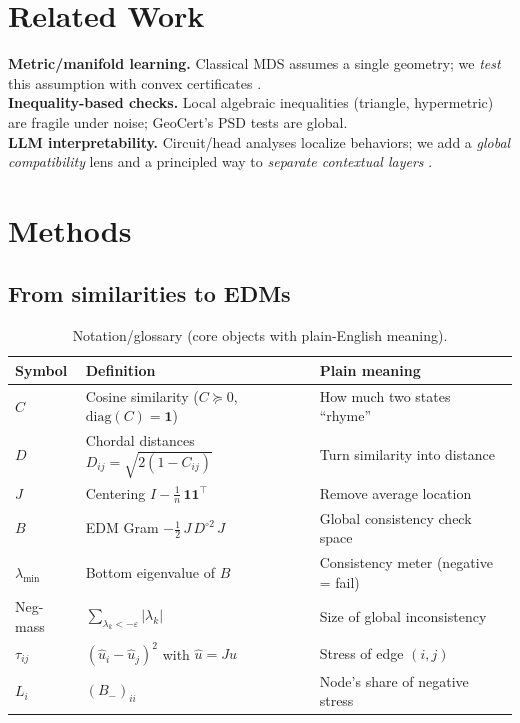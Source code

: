 \documentclass[11pt]{article}
\newcommand{\1}{\mathbf{1}}
\newcommand{\diag}{\mathrm{diag}}
\newcommand{\PSD}{\succeq 0}
\begin{document}
\section{Related Work}
\textbf{Metric/manifold learning.} Classical MDS assumes a single geometry; we \emph{test} this assumption with convex certificates \citep{torgerson1952,borg2005}.\\
\textbf{Inequality-based checks.} Local algebraic inequalities (triangle, hypermetric) are fragile under noise; GeoCert’s PSD tests are global.\\
\textbf{LLM interpretability.} Circuit/head analyses localize behaviors; we add a \emph{global compatibility} lens and a principled way to \emph{separate contextual layers} \citep{Vig2020CausalMediation,Elazar2021Amnesic,Meng2022ROME}.

\section{Methods}
\subsection{From similarities to EDMs}\label{sec:fromCtoB}
\begin{table}[t]
\centering
\caption{Notation/glossary (core objects with plain-English meaning).}
\begin{tabular}{lll}
\toprule
Symbol & Definition & Plain meaning \\
\midrule
$C$ & Cosine similarity ($C\PSD$, $\diag(C)=\mathbf{1}$) & How much two states ``rhyme'' \\
$D$ & Chordal distances $D_{ij}=\sqrt{2(1-C_{ij})}$ & Turn similarity into distance \\
$J$ & Centering $I-\tfrac1n\,\mathbf{1}\mathbf{1}^\top$ & Remove average location \\
$B$ & EDM Gram $-\tfrac12\,J\,D^{\circ2}\,J$ & Global consistency check space \\
$\lambda_{\min}$ & Bottom eigenvalue of $B$ & Consistency meter (negative = fail) \\
Neg-mass & $\sum_{\lambda_k< -\varepsilon}|\lambda_k|$ & Size of global inconsistency \\
$\tau_{ij}$ & $(\hat u_i-\hat u_j)^2$ with $\hat u=Ju$ & Stress of edge $(i,j)$ \\
$L_i$ & $(B_-)_{ii}$ & Node's share of negative stress \\
\bottomrule
\end{tabular}
\end{table}
\end{document}
